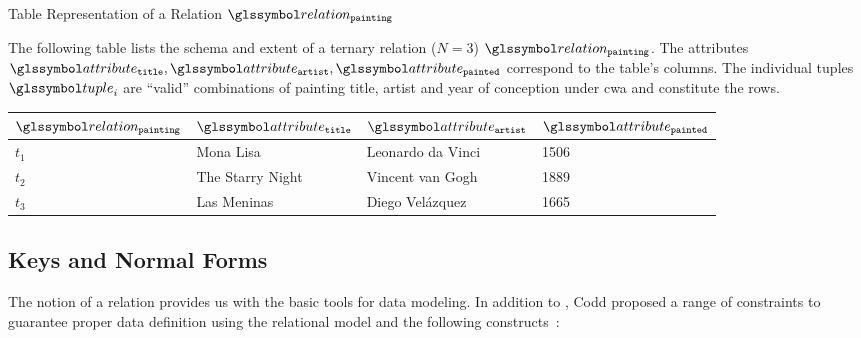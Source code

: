 \begin{example}[label=example:relational_table]{Table Representation of a Relation $\relation_{\mathtt{painting}}$}{}
    
    The following table lists the schema and extent of a ternary relation ($N = 3$) $\relation_{\mathtt{painting}}$. The attributes $\attribute_{\mathtt{title}}, \attribute_{\mathtt{artist}}, \attribute_{\mathtt{painted}}$ correspond to the table's columns. The individual tuples $\tuple_i$ are ``valid'' combinations of painting title, artist and year of conception under \acrshort{cwa} and constitute the rows.
        
    \begin{center}
        \begin{tabular}{ l || l | l | l |}
            $\relation_{\mathtt{painting}}$ & $\attribute_\mathtt{title}$  & $\attribute_{\mathtt{artist}}$  & $\attribute_{\mathtt{painted}}$ \\ 
            \hline
            \hline
            $t_1$ & Mona Lisa &  Leonardo da Vinci & 1506 \\
            \hline
            $t_2$ & The Starry Night & Vincent van Gogh & 1889 \\
            \hline
            $t_3$ & Las Meninas & Diego Velázquez & 1665 \\
            \hline
        \end{tabular}
    \end{center}
\end{example}


\subsection{Keys and Normal Forms}

The notion of a relation provides us with the basic tools for data modeling. In addition to , Codd proposed a range of constraints to guarantee proper data definition using the relational model and the following constructs~\cite{Codd:1970Relational}:

